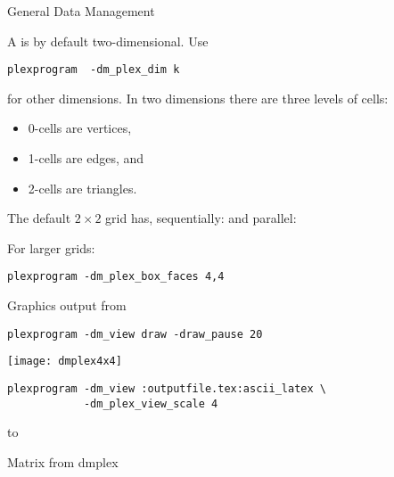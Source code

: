 
 {General Data Management}


A  is by default two-dimensional.
Use
\begin{verbatim}
plexprogram  -dm_plex_dim k
\end{verbatim}
for other dimensions.
In two dimensions there are three levels of cells:
\begin{itemize}
\item
  0-cells are vertices,
\item 1-cells are edges, and
\item 2-cells are triangles.
\end{itemize}

The default $2\times 2$ grid has, sequentially:
and parallel:

For larger grids:
\begin{verbatim}
plexprogram -dm_plex_box_faces 4,4
\end{verbatim}

\begin{multicols}{2}
  Graphics output from
\begin{verbatim}
plexprogram -dm_view draw -draw_pause 20
\end{verbatim}
\vfill\hbox{}
\columnbreak
\texttt{[image: dmplex4x4]}
\end{multicols}

\begin{verbatim}
plexprogram -dm_view :outputfile.tex:ascii_latex \
            -dm_plex_view_scale 4
\end{verbatim}

\hbox to \textwidth {

\hfil

}

 {Matrix from dmplex}

